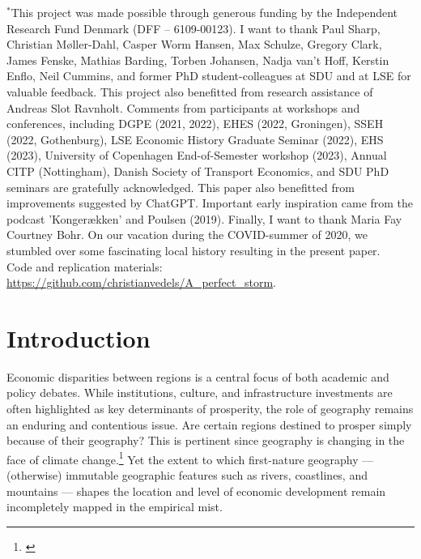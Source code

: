 \documentclass[12pt]{article}
\begin{document}
\begin{titlepage}
    \footnotesize
    $^*$This project was made possible through generous funding by the Independent Research Fund Denmark (DFF – 6109-00123). I want to thank Paul Sharp, Christian Møller-Dahl, Casper Worm Hansen, Max Schulze, Gregory Clark, James Fenske, Mathias Barding, Torben Johansen, Nadja van't Hoff, Kerstin Enflo, Neil Cummins, and former PhD student-colleagues at SDU and at LSE for valuable feedback. This project also benefitted from research assistance of Andreas Slot Ravnholt. Comments from participants at workshops and conferences, including DGPE (2021, 2022), EHES (2022, Groningen), SSEH (2022, Gothenburg), LSE Economic History Graduate Seminar (2022), EHS (2023), University of Copenhagen End-of-Semester workshop (2023), Annual CITP (Nottingham), Danish Society of Transport Economics, and SDU PhD seminars are gratefully acknowledged. This paper also benefitted from improvements suggested by ChatGPT. Important early inspiration came from the podcast 'Kongerækken' and Poulsen (2019). Finally, I want to thank Maria Fay Courtney Bohr. On our vacation during the COVID-summer of 2020, we stumbled over some fascinating local history resulting in the present paper.  \\
    Code and replication materials: \url{https://github.com/christianvedels/A_perfect_storm}.
    

\end{titlepage}
\newpage

\section{Introduction} \label{intro}

Economic disparities between regions is a central focus of both academic and policy debates. While institutions, culture, and infrastructure investments are often highlighted as key determinants of prosperity, the role of geography remains an enduring and contentious issue. Are certain regions destined to prosper simply because of their geography? This is pertinent since geography is changing in the face of climate change.\footnote{\citet{kavan2025new, IPCCAR6SYR2023, Mentaschi2018}} Yet the extent to which first-nature geography — (otherwise) immutable geographic features such as rivers, coastlines, and mountains — shapes the location and level of economic development remain incompletely mapped in the empirical mist.
\end{document}

